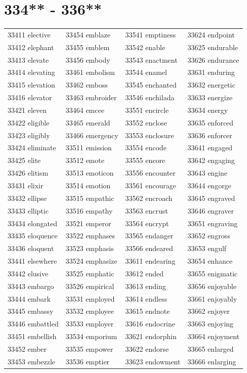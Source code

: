 \documentclass[10pt, oneside]{book}
\begin{document}
\begin{table}
	\centering
	\section*{334** - 336**}
	\begin{tabular}{l l l l}
33411 elective &33454 emblaze &33541 emptiness &33624 endpoint\\
33412 elephant &33455 emblem &33542 enable &33625 endurable\\
33413 elevate &33456 embody &33543 enactment &33626 endurance\\
33414 elevating &33461 embolism &33544 enamel &33631 enduring\\
33415 elevation &33462 emboss &33545 enchanted &33632 energetic\\
33416 elevator &33463 embroider &33546 enchilada &33633 energize\\
33421 eleven &33464 emcee &33551 encircle &33634 energy\\
33422 eligible &33465 emerald &33552 enclose &33635 enforced\\
33423 eligibly &33466 emergency &33553 enclosure &33636 enforcer\\
33424 eliminate &33511 emission &33554 encode &33641 engaged\\
33425 elite &33512 emote &33555 encore &33642 engaging\\
33426 elitism &33513 emoticon &33556 encounter &33643 engine\\
33431 elixir &33514 emotion &33561 encourage &33644 engorge\\
33432 ellipse &33515 empathic &33562 encroach &33645 engraved\\
33433 elliptic &33516 empathy &33563 encrust &33646 engraver\\
33434 elongated &33521 emperor &33564 encrypt &33651 engraving\\
33435 eloquence &33522 emphases &33565 endanger &33652 engross\\
33436 eloquent &33523 emphasis &33566 endeared &33653 engulf\\
33441 elsewhere &33524 emphasize &33611 endearing &33654 enhance\\
33442 elusive &33525 emphatic &33612 ended &33655 enigmatic\\
33443 embargo &33526 empirical &33613 ending &33656 enjoyable\\
33444 embark &33531 employed &33614 endless &33661 enjoyably\\
33445 embassy &33532 employee &33615 endnote &33662 enjoyer\\
33446 embattled &33533 employer &33616 endocrine &33663 enjoying\\
33451 embellish &33534 emporium &33621 endorphin &33664 enjoyment\\
33452 ember &33535 empower &33622 endorse &33665 enlarged\\
33453 embezzle &33536 emptier &33623 endowment &33666 enlarging\\
	\end{tabular}
 \end{table}
\clearpage
\end{document}
